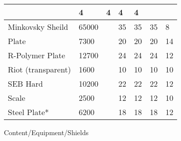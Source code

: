 \documentclass[twoside]{book}
\begin{document}
\begin{longtable}{p{1.25in}llp{3em}p{3em}p{3em}p{3em}}
  &
   4 
  &
   4 
  &
   4 
  &
   4 
  \tabularnewline
  \hline
      
  \raggedright
           Minkovsky Sheild 
  &
   65000 
  &
  
  &
   35 
  &
   35 
  &
   35 
  &
   8 
  \tabularnewline
  \hline
      
  \raggedright
           Plate 
  &
   7300 
  &
  
  &
   20 
  &
   20 
  &
   20 
  &
   14 
  \tabularnewline
  \hline
      
  \raggedright
           R-Polymer Plate 
  &
   12700 
  &
  
  &
   24 
  &
   24 
  &
   24 
  &
   12 
  \tabularnewline
  \hline
      
  \raggedright
           Riot (transparent) 
  &
   1600 
  &
  
  &
   10 
  &
   10 
  &
   10 
  &
   10 
  \tabularnewline
  \hline
      
  \raggedright
           SEB Hard 
  &
   10200 
  &
  
  &
   22 
  &
   22 
  &
   22 
  &
   12 
  \tabularnewline
  \hline
      
  \raggedright
           Scale 
  &
   2500 
  &
  
  &
   12 
  &
   12 
  &
   12 
  &
   10 
  \tabularnewline
  \hline
      
  \raggedright
           Steel Plate* 
  &
   6200 
  &
  
  &
   18 
  &
   18 
  &
   18 
  &
   12 
  \tabularnewline
  \hline
      
\end{longtable}
    Content/Equipment/Shields
\hspace{-2ex}

\vspace{1ex}
    
\hspace{-2ex}

\vspace{1ex}
    
\hspace{-2ex}

\vspace{1ex}
    
\hspace{-2ex}

\vspace{1ex}
    
\end{document}
